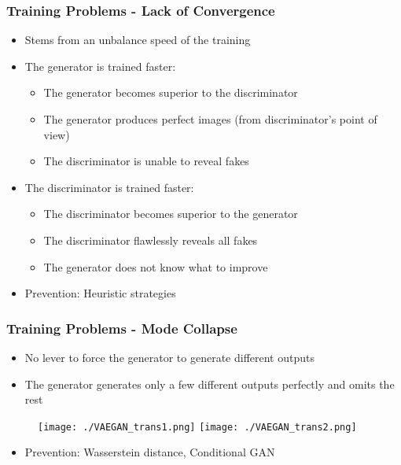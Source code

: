 \begin{frame}
\frametitle{Training Problems - Lack of Convergence}
	\begin{itemize}
		\item Stems from an unbalance speed of the training
		\item The generator is trained faster:
		\begin{itemize}
			\item The generator becomes superior to the discriminator
			\item The generator produces perfect images (from discriminator's point of view)
			\item The discriminator is unable to reveal fakes
		\end{itemize}
		\item The discriminator is trained faster:
		\begin{itemize}
			\item The discriminator becomes superior to the generator
			\item The discriminator flawlessly reveals all fakes
			\item The generator does not know what to improve
		\end{itemize}
		\item Prevention: Heuristic strategies			
	\end{itemize}

\end{frame}

\begin{frame}
\frametitle{Training Problems - Mode Collapse}
	\begin{itemize}
		\item No lever to force the generator to generate different outputs
		\item The generator generates only a few different outputs perfectly and omits the rest
	\end{itemize}
	\begin{figure}[!ht]
	\centering
	\texttt{[image: ./VAEGAN\_trans1.png]}
	\texttt{[image: ./VAEGAN\_trans2.png]}
\end{figure}
	\begin{itemize}
		\item Prevention: Wasserstein distance, Conditional GAN
	\end{itemize}
\end{frame}

